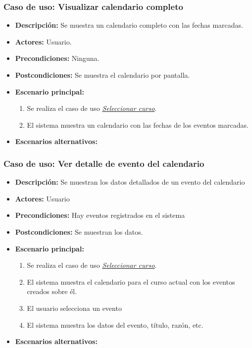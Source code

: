 \subsubsection*{Caso de uso: Visualizar calendario completo}
\begin{itemize}
\item{\bf Descripción:} Se muestra un calendario completo con las fechas marcadas.
\item{\bf Actores:} Usuario.
\item{\bf Precondiciones:} Ninguna.
\item{\bf Postcondiciones:} Se muestra el calendario por pantalla.
\item{\bf Escenario principal:}
	\begin{enumerate}
	\item Se realiza el caso de uso {\em \hyperref[select_curso]{Seleccionar curso}}.
	\item El sistema muestra un calendario con las fechas de los eventos marcadas.
	\end{enumerate}
\item{\bf Escenarios alternativos:}
\end{itemize}


\subsubsection*{Caso de uso: Ver detalle de evento del calendario}
\begin{itemize}
\item{\bf Descripción:} Se muestran los datos detallados de un evento del calendario
\item{\bf Actores:} Usuario
\item{\bf Precondiciones:} Hay eventos registrados en el sistema
\item{\bf Postcondiciones:} Se muestran los datos.
\item{\bf Escenario principal:}
	\begin{enumerate}
	\item Se realiza el caso de uso {\em \hyperref[select_curso]{Seleccionar curso}}.
	\item El sistema muestra el calendario para el curso actual con los eventos creados sobre él.
	\item El usuario selecciona un evento
	\item El sistema muestra los datos del evento, título, razón, etc.
	\end{enumerate}
\item{\bf Escenarios alternativos:}
\end{itemize}




